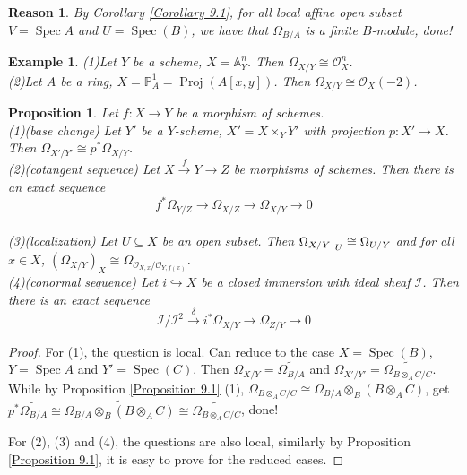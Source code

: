 \documentclass{ctexart}
\newtheorem{proposition}{Proposition}[section]
\newtheorem{reason}{Reason}[section]
\newtheorem{example}{Example}[section]
\newcommand{\spec}{\operatorname{Spec}}
\newcommand{\proj}{\operatorname{Proj}}
\begin{document}
\begin{reason}
    By Corollary \ref{Corollary 9.1}, for all local affine open subset $V = \spec A$ and $U = \spec(B)$, we have that $\Omega_{B/A}$ is a finite $B$-module, done!
\end{reason}
\begin{example}
    (1)Let $Y$ be a scheme, $X = \mathbb{A}_{Y}^{n}$.
    Then $\Omega_{X/Y} \cong \mathcal{O}_{X}^{n}$. \\
    (2)Let $A$ be a ring, $X = \mathbb{P}_{A}^{1} = \proj(A[x, y])$.
    Then $\Omega_{X/Y} \cong \mathcal{O}_{X}(-2)$.
\end{example}
\begin{proposition}
    Let $f: X \longrightarrow Y$ be a morphism of schemes. \\
    (1)(base change)
    Let $Y'$ be a $Y$-scheme, $X' = X \times_{Y} Y'$ with projection $p: X' \longrightarrow X$.
    Then $\Omega_{X'/Y'} \cong p^{\ast}\Omega_{X/Y}$. \\
    (2)(cotangent sequence)
    Let $X \overset{f}{\longrightarrow} Y \longrightarrow Z$ be morphisms of schemes.
    Then there is an exact sequence
    \begin{equation*}
        f^{\ast}\Omega_{Y/Z} \longrightarrow \Omega_{X/Z} \longrightarrow \Omega_{X/Y} \longrightarrow 0
    \end{equation*}
    \\
    (3)(localization)
    Let $U \subseteq X$ be an open subset.
    Then $\Omega_{X/Y}\big{|}_{U} \cong \Omega_{U/Y}$ and for all $x\in X$, $(\Omega_{X/Y})_{X} \cong \Omega_{\mathcal{O}_{X,x}/\mathcal{O}_{Y, f(x)}}$. \\
    (4)(conormal sequence)
    Let $i \hookrightarrow X$ be a closed immersion with ideal sheaf $\mathcal{I}$.
    Then there is an exact sequence
    \begin{equation*}
        \mathcal{I}/\mathcal{I}^{2} \overset{\delta}{\longrightarrow} i^{\ast}\Omega_{X/Y} \longrightarrow \Omega_{Z/Y} \longrightarrow 0
    \end{equation*}
    \label{Proposition 9.5}
\end{proposition}
\begin{proof}
    For (1), the question is local.
    Can reduce to the case $X = \spec(B)$, $Y = \spec A$ and $Y' = \spec(C)$.
    Then $\Omega_{X/Y} = \widetilde{\Omega_{B/A}}$ and $\Omega_{X'/Y'} = \widetilde{\Omega_{B \otimes_{A} C/C}}$.
    While by Proposition \ref{Proposition 9.1} (1), $\Omega_{B \otimes_{A} C/C} \cong \Omega_{B/A} \otimes_{B} (B \otimes_{A} C)$,
    get $p^{\ast}\widetilde{\Omega_{B/A}} \cong \widetilde{\Omega_{B/A} \otimes_{B} (B \otimes_{A} C)} \cong \widetilde{\Omega_{B \otimes_{A} C/C}}$, done!
    \par
    For (2), (3) and (4), the questions are also local, similarly by Proposition \ref{Proposition 9.1}, it is easy to prove for the reduced cases.
\end{proof}
\end{document}

